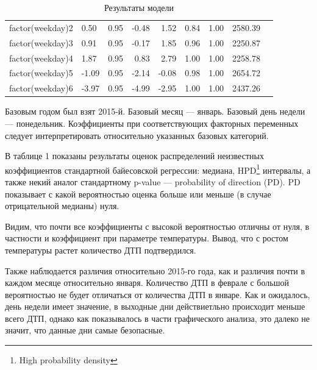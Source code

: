 \documentclass[a4paper, 14pt]{article}
\begin{document}
\begin{table}[ht]
\begin{tabular}{rlrrrrrrr}
		factor(weekday)2 & 0.50 & 0.95 & -0.48 & 1.52 & 0.84 & 1.00 & 2580.39 \\ 
		factor(weekday)3 & 0.91 & 0.95 & -0.17 & 1.85 & 0.96 & 1.00 & 2250.87 \\ 
		factor(weekday)4 & 1.87 & 0.95 & 0.83 & 2.79 & 1.00 & 1.00 & 2258.78 \\ 
		factor(weekday)5 & -1.09 & 0.95 & -2.14 & -0.08 & 0.98 & 1.00 & 2654.72 \\ 
		factor(weekday)6 & -3.97 & 0.95 & -4.99 & -2.95 & 1.00 & 1.00 & 2437.26 \\ 
		\hline
	\end{tabular}
	\caption{Результаты модели}
\end{table}

Базовым годом был взят 2015-й. Базовый месяц --- январь. Базовый день недели --- понедельник. Коэффициенты при соответствующих факторных переменных следует интерпретировать относительно указанных базовых категорий.

В таблице 1 показаны результаты оценок распределений неизвестных коэффициентов стандартной байесовской регрессии: медиана, HPD\footnote{High probability density} интервалы, а также некий аналог стандартному p-value --- probability of direction (PD). PD показывает с какой вероятностью оценка больше или меньше (в случае отрицательной медианы) нуля.

Видим, что почти все коэффициенты с высокой вероятностью отличны от нуля, в частности и коэффициент при параметре температуры. Вывод, что с ростом температуры растет количество ДТП подтвердился. 

Также наблюдается различия относительно 2015-го года, как и различия почти в каждом месяце относительно января. Количество ДТП в феврале с большой вероятностью не будет отличаться от количества ДТП в январе. Как и ожидалось, день недели имеет значение, в выходные дни действиетльно происходит меньше всего ДТП, однако как показывалось в части графического анализа, это далеко не значит, что данные дни самые безопасные.

 




\newpage
\end{document}
